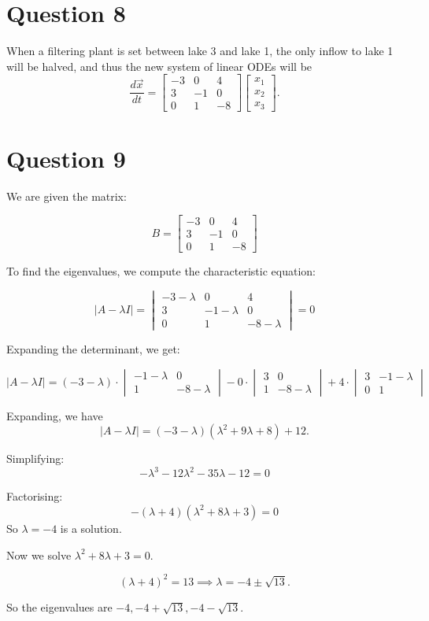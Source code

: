 \documentclass[12pt,a4paper]{article}
\begin{document}
\section*{Question 8}
\begin{solution}
When a filtering plant is set between lake 3 and lake 1, the only inflow to lake 1 will be halved, and thus the new system of linear ODEs will be
\[
\frac{d \vec{x}}{d t}=\left[\begin{array}{ccc}
-3 & 0 & 4 \\
3 & -1 & 0 \\
0 & 1 & -8
\end{array}\right]\left[\begin{array}{l}
x_1 \\
x_2 \\
x_3
\end{array}\right].
\]
\section*{Question 9}
We are given the matrix:

\[
B = \begin{bmatrix}
-3 & 0 & 4 \\
3 & -1 & 0 \\
0 & 1 & -8
\end{bmatrix}
\]

To find the eigenvalues, we compute the characteristic equation:

\[
|A - \lambda I| = 
\begin{vmatrix}
-3 - \lambda & 0 & 4 \\
3 & -1 - \lambda & 0 \\
0 & 1 & -8 - \lambda
\end{vmatrix} = 0
\]

Expanding the determinant, we get:

\[
|A - \lambda I| = (-3 - \lambda) \cdot 
\begin{vmatrix}
-1 - \lambda & 0 \\
1 & -8 - \lambda
\end{vmatrix} 
- 0 \cdot \begin{vmatrix}
3 & 0 \\
1 & -8 - \lambda
\end{vmatrix}
+ 4 \cdot 
\begin{vmatrix}
3 & -1 - \lambda \\
0 & 1
\end{vmatrix}
\]

Expanding, we have
\[
|A - \lambda I| = (-3 - \lambda)(\lambda^2 + 9\lambda + 8) + 12.
\]

Simplifying:
\[
-\lambda^3 - 12\lambda^2 - 35\lambda -12= 0
\]

Factorising:
\[
-(\lambda+4)\left(\lambda^2+8 \lambda+3\right)=0
\]
So $\lambda = -4$ is a solution.

Now we solve $\lambda^2+8 \lambda+3=0$.

\[
(\lambda + 4)^2 = 13 \implies \lambda = -4 \pm \sqrt{13}.
\]

So the eigenvalues are $-4, -4 + \sqrt{13}, -4 - \sqrt{13}$.
\end{solution}
\end{document}
